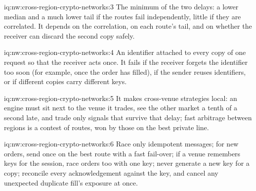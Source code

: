 \begin{solution}{iq:nw:cross-region-crypto-networks:3}
The minimum of the two delays: a lower median and a much lower tail if the routes fail independently, little if they are correlated. It depends on the
correlation, on each route's tail, and on whether the receiver can discard the second copy safely.
\end{solution}

\begin{solution}{iq:nw:cross-region-crypto-networks:4}
An identifier attached to every copy of one request so that the receiver acts once. It fails if the receiver forgets the identifier too soon (for
example, once the order has filled), if the sender reuses identifiers, or if different copies carry different keys.
\end{solution}

\begin{solution}{iq:nw:cross-region-crypto-networks:5}
It makes cross-venue strategies local: an engine must sit next to the venue it trades, see the other market a tenth of a second late, and trade only
signals that survive that delay; fast arbitrage between regions is a contest of routes, won by those on the best private line.
\end{solution}

\begin{solution}{iq:nw:cross-region-crypto-networks:6}
Race only idempotent messages; for new orders, send once on the best route with a fast fail-over; if a venue remembers keys for the session, race orders
too with one key; never generate a new key for a copy; reconcile every acknowledgement against the key, and cancel any unexpected duplicate fill's
exposure at once.
\end{solution}
